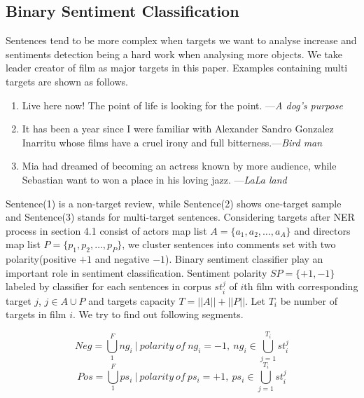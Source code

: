 \subsection{Binary Sentiment Classification}
\par Sentences tend to be more complex when targets we want to analyse increase and sentiments detection being a hard work when analysing more objects. We take leader creator of film as major targets in this paper. Examples containing multi targets are shown as follows.
\begin{enumerate}
  \item Live here now! The point of life is looking for the point. ---\emph{A dog's purpose}
  \item It has been a year since I were familiar with Alexander Sandro Gonzalez Inarritu whose films have a cruel irony and full bitterness.---\emph{Bird man}
  \item Mia had dreamed of becoming an actress known by more audience, while Sebastian want to won a place in his loving jazz. ---\emph{LaLa land}
\end{enumerate}
\par  Sentence(1) is a non-target review, while Sentence(2) shows one-target sample and Sentence(3) stands for multi-target sentences. Considering targets after NER process in section 4.1 consist of actors map list $A=\{a_1, a_2, \dots, a_A\}$ and directors map list $P=\{p_1, p_2, \dots, p_P\}$, we cluster sentences into comments set with two polarity(positive $+1$ and negative $-1$). Binary sentiment classifier play an important role in sentiment classification. Sentiment polarity $SP=\{+1, -1\}$ labeled by classifier for each sentences in corpus $st_i^j$ of $i$th film with corresponding target $j$, $j \in A \cup P $ and targets capacity $T = ||A||+||P||$. Let $T_i$ be number of targets in film $i$. We try to find out following segments.

\begin{equation}
    Neg=\bigcup_1^{F} ng_i \ | \ polarity \ of \ ng_i = -1, \ ng_i \in \bigcup_{j=1}^{T_i} st_i^j
    \label{eq:neg}
\end{equation}
\begin{equation}
    Pos=\bigcup_1^{F} ps_i \ | \ polarity \ of \ ps_i = +1, \ ps_i \in \bigcup_{j=1}^{T_i} st_i^j
    \label{eq:pos}
\end{equation}

